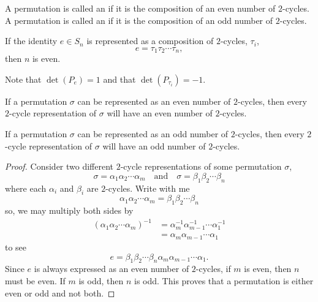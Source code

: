 \documentclass{ximera}
\begin{document}
\begin{definition}
  A permutation is called an  if it is the
  composition of an even number of $2$-cycles. A permutation is called
  an  if it is the composition of an odd number
  of $2$-cycles.
\end{definition}










\begin{lemma}
  If the identity $e\in S_n$ is represented as a composition of $2$-cycles, $\tau_i$, 
  \[
  e = \tau_1 \tau_2 \cdots \tau_n,
  \]
  then $n$ is even.
  \begin{sketch}
    Note that $\det(P_{e})=1$ and that $\det(P_{\tau_i})=-1$.
  \end{sketch}
\end{lemma}

\begin{lemma}
  If a permutation $\sigma$ can be represented as an even number of
  $2$-cycles, then every $2$-cycle representation of $\sigma$ will
  have an even number of $2$-cycles.

  If a permutation $\sigma$ can be represented as an odd number of
  $2$-cycles, then every $2$-cycle representation of $\sigma$ will
  have an odd number of $2$-cycles.
  \begin{proof}
    Consider two different $2$-cycle representations of some
    permutation $\sigma$,
    \[
    \sigma = \alpha_1\alpha_2\cdots\alpha_m \quad\text{and}\quad \sigma = \beta_1\beta_2\cdots\beta_n 
    \]
    where each $\alpha_i$ and $\beta_i$ are $2$-cycles. Write with me
    \[
    \alpha_1\alpha_2\cdots\alpha_m = \beta_1\beta_2\cdots\beta_n
    \]
    so, we may multiply both sides by
    \begin{align*}
      (\alpha_1\alpha_2\cdots\alpha_m)^{-1} &= \alpha_m^{-1}\alpha_{m-1}^{-1}\cdots\alpha_1^{-1}\\
      &= \alpha_m\alpha_{m-1}\cdots\alpha_1
    \end{align*}
    to see
    \[
    e = \beta_1\beta_2\cdots\beta_n\alpha_m\alpha_{m-1}\cdots\alpha_1.
    \]
    Since $e$ is always expressed as an even number of $2$-cycles, if
    $m$ is even, then $n$ must be even. If $m$ is odd, then $n$ is
    odd. This proves that a permutation is either even or odd and not
    both.
  \end{proof}
\end{lemma}
\end{document}
